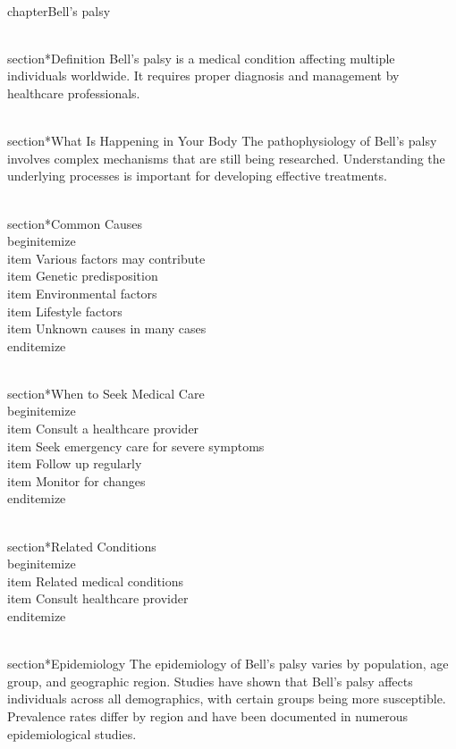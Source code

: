 
\\chapter{Bell's palsy}

\\section*{Definition}
Bell's palsy is a medical condition affecting multiple individuals worldwide. It requires proper diagnosis and management by healthcare professionals.

\\section*{What Is Happening in Your Body}
The pathophysiology of Bell's palsy involves complex mechanisms that are still being researched. Understanding the underlying processes is important for developing effective treatments.

\\section*{Common Causes}
\\begin{itemize}
\\item Various factors may contribute\n  \\item Genetic predisposition\n  \\item Environmental factors\n  \\item Lifestyle factors\n  \\item Unknown causes in many cases
\\end{itemize}

\\section*{When to Seek Medical Care}
\\begin{itemize}
\\item Consult a healthcare provider\n  \\item Seek emergency care for severe symptoms\n  \\item Follow up regularly\n  \\item Monitor for changes
\\end{itemize}

\\section*{Related Conditions}
\\begin{itemize}
\\item Related medical conditions\n  \\item Consult healthcare provider
\\end{itemize}

\\section*{Epidemiology}
The epidemiology of Bell's palsy varies by population, age group, and geographic region. Studies have shown that Bell's palsy affects individuals across all demographics, with certain groups being more susceptible. Prevalence rates differ by region and have been documented in numerous epidemiological studies.

